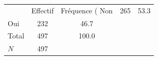 {
\def\sym#1{\ifmmode^{#1}\else\(^{#1}\)\fi}
\begin{tabular}{l*{1}{cc}}
\toprule
            &    Effectif&Fréquence (%
\midrule
Non         &         265&        53.3\\
Oui         &         232&        46.7\\
Total       &         497&       100.0\\
\midrule
\(N\)       &         497&            \\
\bottomrule
\end{tabular}
}
